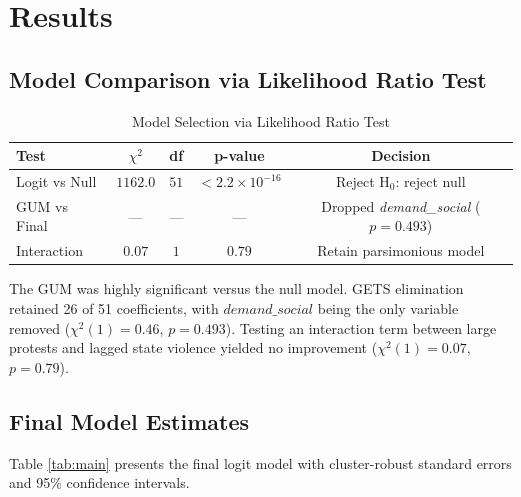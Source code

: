\documentclass[11pt,a4paper]{article}
\begin{document}
\section{Results}

\subsection{Model Comparison via Likelihood Ratio Test}

\begin{table}[ht!]
\centering
\caption{Model Selection via Likelihood Ratio Test}
\label{tab:lr}
\small
\begin{tabular}{lcccc}
\toprule
\textbf{Test} & \textbf{$\chi^2$} & \textbf{df} & \textbf{p-value} & \textbf{Decision} \\
\midrule
Logit vs Null & $1162.0$ & $51$ & $< 2.2 \times 10^{-16}$ & Reject H$_0$: reject null \\
GUM vs Final & --- & ---& --- & Dropped \textit{demand\_social} ($p = 0.493$) \\
Interaction & $0.07$ & $1$ & $0.79$ & Retain parsimonious model \\
\bottomrule
\end{tabular}
\end{table}

The GUM was highly significant versus the null model. GETS elimination retained 26 of 51 coefficients, with $\textit{demand\_social}$ being the only variable removed ($\chi^2(1) = 0.46$, $p = 0.493$). Testing an interaction term between large protests and lagged state violence yielded no improvement ($\chi^2(1) = 0.07$, $p = 0.79$).

\subsection{Final Model Estimates}

Table \ref{tab:main} presents the final logit model with cluster-robust standard errors and 95\% confidence intervals.
\end{document}
